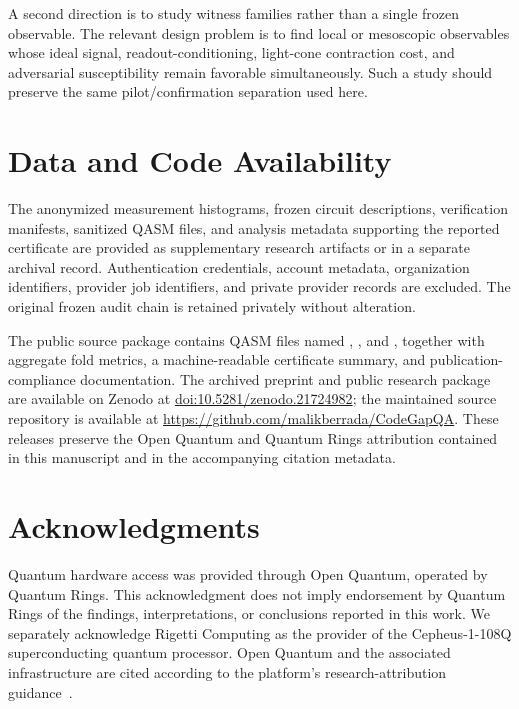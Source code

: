 \documentclass[11pt]{article}
\begin{document}
A second direction is to study witness families rather than a single frozen observable. The relevant design problem is to find local or mesoscopic observables whose ideal signal, readout-conditioning, light-cone contraction cost, and adversarial susceptibility remain favorable simultaneously. Such a study should preserve the same pilot/confirmation separation used here.

\section{Data and Code Availability}
The anonymized measurement histograms, frozen circuit descriptions, verification manifests, sanitized QASM files, and analysis metadata supporting the reported certificate are provided as supplementary research artifacts or in a separate archival record. Authentication credentials, account metadata, organization identifiers, provider job identifiers, and private provider records are excluded. The original frozen audit chain is retained privately without alteration.

The public source package contains QASM files named , , and , together with aggregate fold metrics, a machine-readable certificate summary, and publication-compliance documentation. The archived preprint and public research package are available on Zenodo at \href{https://doi.org/10.5281/zenodo.21724982}{doi:10.5281/zenodo.21724982}; the maintained source repository is available at \url{https://github.com/malikberrada/CodeGapQA}. These releases preserve the Open Quantum and Quantum Rings attribution contained in this manuscript and in the accompanying citation metadata.

\section*{Acknowledgments}
Quantum hardware access was provided through Open Quantum, operated by Quantum Rings. This acknowledgment does not imply endorsement by Quantum Rings of the findings, interpretations, or conclusions reported in this work. We separately acknowledge Rigetti Computing as the provider of the Cepheus-1-108Q superconducting quantum processor. Open Quantum and the associated infrastructure are cited according to the platform's research-attribution guidance~\cite{openquantum,openquantumwebsite2026}.
\end{document}

